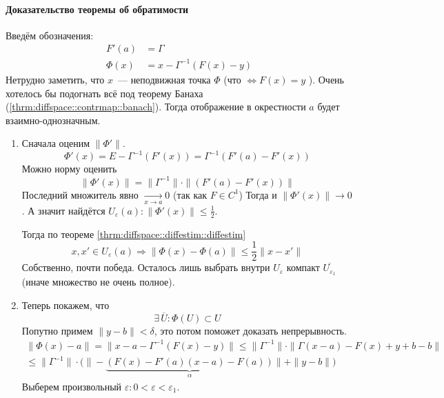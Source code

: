 \documentclass[12pt,trimbord]{../../../notes}
\begin{document}
\paragraph{Доказательство теоремы об обратимости}
\label{par:diffspace::invmapproof}

\begin{ittproof}
  Введём обозначения:
  \begin{align*}
    F'(a) &= \Gamma\\
    \Phi(x) &= x - \Gamma^{-1} (F(x) - y)
  \end{align*}
  Нетрудно заметить, что $x$~--- неподвижная точка $\Phi$ (что $\Leftrightarrow F(x)=y$ ).
  Очень хотелось бы подогнать всё под теорему Банаха (\ref{thrm:diffspace::contrmap::banach}).
  Тогда отображение в окрестности $a$ будет взаимно-однозначным.

  \begin{enumerate}
    \item Сначала оценим $\|\Phi'\|$.
      \[
        \Phi'(x) = E - \Gamma^{-1} (F'(x)) = \Gamma^{-1} (F'(a) - F'(x))
      \]
      Можно норму оценить
      \[
        \|\Phi'(x)\| = \| \Gamma^{-1} \| \cdot \| (F'(a) - F'(x)) \|
      \]
      Последний множитель явно $\xrightarrow[x\to a]{} 0$ (так как $F\in C^1$)
      Тогда и $\|\Phi'(x)\|\to 0$. А значит найдётся $U_\varepsilon(a) \colon 
      \|\Phi'(x)\| \leqslant \frac{1}{2}$.
      
      Тогда по теореме \ref{thrm:diffspace::diffestim::diffestim} 
      \[
        x, x' \in U_\varepsilon(a) \Rightarrow \| \Phi(x) - \Phi(a)\| \leqslant \frac{1}{2}
        \|x-x'\|
      \]
      Собственно, почти победа. Осталось лишь выбрать внутри $U_\varepsilon$ компакт
      $\overline{U_{\varepsilon_1}}$ (иначе множество не очень полное).

    \item Теперь покажем, что 
      \[
        \exists\, \overline{U} \colon \Phi(U) \subset U  
      \]
      Попутно примем $\|y-b\| < \delta$, это потом поможет доказать непрерывность.
      \[
        \begin{split}
          \|\Phi(x) - a\| = \| x - a - \Gamma^{-1}(F(x)-y)\| 
          \leqslant \|\Gamma^{-1}\| \cdot \| \Gamma (x-a) - F(x) + y + b - b\| \\ 
          \leqslant \|\Gamma^{-1}\| 
          \cdot \bigl(\| - \underbrace{( F(x) - F'(a)(x-a) - F(a) )}_{\alpha}\| + \| y - b\| \bigr)
        \end{split}
      \]
      Выберем произвольный $\varepsilon \colon 0 < \varepsilon < \varepsilon_1$.
      

\end{enumerate}
\end{ittproof}
\end{document}
